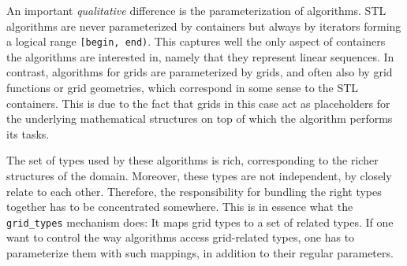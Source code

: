   An important {\em qualitative\/} difference is the parameterization of algorithms.
  STL algorithms are never parameterized by containers but always by iterators
  forming a logical range {\tt [begin, end)}. This captures well the only aspect of 
  containers the algorithms are interested in, namely that they represent linear 
  sequences.
  In contrast, algorithms for grids are parameterized by grids, and often also
  by grid functions or grid geometries, which correspond  in some sense
  to the STL containers. 
  This is due to the fact that grids in this case act as placeholders
  for the underlying mathematical structures on top of which the algorithm
  performs its tasks.

  The set of types used by these algorithms is rich, corresponding to
  the richer structures of the domain. Moreover, these types are not
  independent, by closely relate to each other.
  Therefore, the responsibility for bundling the right types together
  has to be concentrated somewhere.
  This is in essence what the {\tt grid\_types} mechanism does:
  It maps grid types to a set of related types.
  If one want to control the way  algorithms access grid-related types,
  one has to parameterize them with such mappings, 
  in addition to their regular parameters.
 

  

